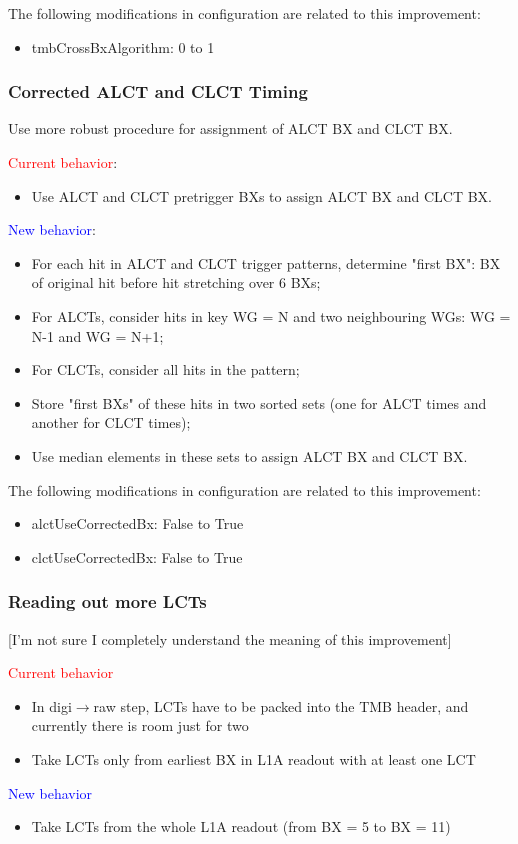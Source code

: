The following modifications in configuration are related to this improvement:
\begin{itemize}
    \item tmbCrossBxAlgorithm: 0 to 1
\end{itemize}

\newpage

\subsubsection{Corrected ALCT and CLCT Timing}

Use more robust procedure for assignment of ALCT BX and CLCT BX.

\textcolor{red}{Current behavior}:
\begin{itemize}
    \item Use ALCT and CLCT pretrigger BXs to assign ALCT BX and CLCT BX.
\end{itemize}
\textcolor{blue}{New behavior}:
\begin{itemize}
    \item For each hit in ALCT and CLCT trigger patterns, determine "first BX": BX of original hit before hit stretching over 6 BXs;
    \item For ALCTs, consider hits in key WG = N and two neighbouring WGs: WG = N-1 and WG = N+1;
    \item For CLCTs, consider all hits in the pattern;
    \item Store "first BXs" of these hits in two sorted sets (one for ALCT times and another for CLCT times);
    \item Use median elements in these sets to assign ALCT BX and CLCT BX.
\end{itemize}

The following modifications in configuration are related to this improvement:
\begin{itemize}
    \item alctUseCorrectedBx: False to True
    \item clctUseCorrectedBx: False to True
\end{itemize}

\subsubsection{Reading out more LCTs}

[I'm not sure I completely understand the meaning of this improvement]

\textcolor{red}{Current behavior}
\begin{itemize}
    \item In digi$\rightarrow$raw step, LCTs have to be packed into the TMB header, and currently there is room just for two
    \item Take LCTs only from earliest BX in L1A readout with at least one LCT
\end{itemize}
\textcolor{blue}{New behavior}
\begin{itemize}
    \item Take LCTs from the whole L1A readout (from BX = 5 to BX = 11)
\end{itemize}

